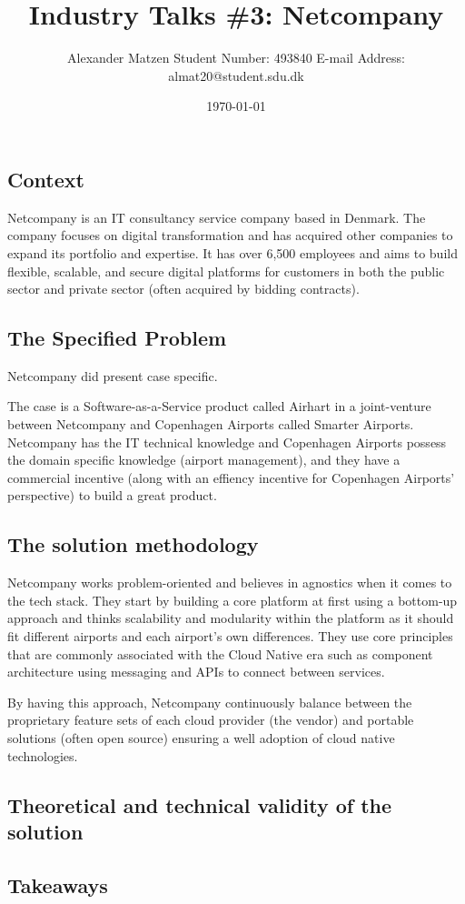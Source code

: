\documentclass[11pt]{article}
\begin{document}
\setlength\parindent{0pt}
\setlength{\parskip}{.15em}
\pagestyle{empty}

\title{Industry Talks \#3: Netcompany}
\author{Alexander Matzen \addvspace{1em} Student Number: 493840 \newline E-mail Address: almat20@student.sdu.dk}
\date{\today}


\pagecolor{white}



\subsection*{Context}
Netcompany is an IT consultancy service company based in Denmark. The company focuses on digital transformation and has acquired other companies to expand its portfolio and expertise. It has over 6,500 employees and aims to build flexible, scalable, and secure digital platforms for customers in both the public sector and private sector (often acquired by bidding contracts).

\subsection*{The Specified Problem}
Netcompany did present case specific.

The case is a Software-as-a-Service product called Airhart in a joint-venture between Netcompany and Copenhagen Airports called Smarter Airports. Netcompany has the IT technical knowledge and Copenhagen Airports possess the domain specific knowledge (airport management), and they have a commercial incentive (along with an effiency incentive for Copenhagen Airports' perspective) to build a great product.


\subsection*{The solution methodology}
Netcompany works problem-oriented and believes in agnostics when it comes to the tech stack. They start by building a core platform at first using a bottom-up approach and thinks scalability and modularity within the platform as it should fit different airports and each airport's own differences. They use core principles that are commonly associated with the Cloud Native era such as component architecture using messaging and APIs to connect between services.

By having this approach, Netcompany continuously balance between the proprietary feature sets of each cloud provider (the vendor) and portable solutions (often open source) ensuring a well adoption of cloud native technologies.

\subsection*{Theoretical and technical validity of the solution}


\subsection*{Takeaways}
\end{document}

